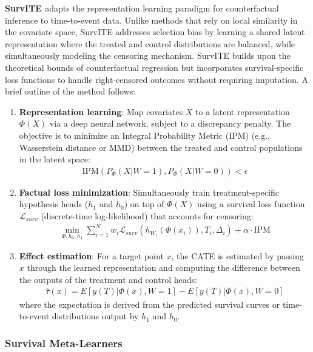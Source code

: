 \textbf{SurvITE \citep{curth2021survite}} adapts the representation learning paradigm for counterfactual inference to time-to-event data. Unlike methods that rely on local similarity in the covariate space, SurvITE addresses selection bias by learning a shared latent representation where the treated and control distributions are balanced, while simultaneously modeling the censoring mechanism.
SurvITE builds upon the theoretical bounds of counterfactual regression but incorporates survival-specific loss functions to handle right-censored outcomes without requiring imputation.
A brief outline of the method follows:
\begin{enumerate}
    \item \textbf{Representation learning}: Map covariates $X$ to a latent representation $\Phi(X)$ via a deep neural network, subject to a discrepancy penalty.
The objective is to minimize an Integral Probability Metric (IPM) (e.g., Wasserstein distance or MMD) between the treated and control populations in the latent space:
        \begin{align*}
            \text{IPM}(P_{\Phi}(X|W=1), P_{\Phi}(X|W=0)) < \epsilon
        \end{align*}
    \item \textbf{Factual loss minimization}: Simultaneously train treatment-specific hypothesis heads ($h_1$ and $h_0$) on top of $\Phi(X)$ using a survival loss function $\mathcal{L}_{surv}$ (discrete-time log-likelihood) that accounts for censoring:
        \begin{align*}
            \min_{\Phi, h_0, h_1} \sum_{i=1}^N w_i \mathcal{L}_{surv}(h_{W_i}(\Phi(x_i)), T_i, \Delta_i) + \alpha \cdot \text{IPM}
        \end{align*}
    \item \textbf{Effect estimation}: For a target point $x$, the CATE is estimated by passing $x$ through the learned representation and computing the difference between the outputs of the treatment and control heads:
        \begin{align*}
             \hat{\tau}(x) = E[y(T)|\Phi(x), W=1] - E[y(T)|\Phi(x), W=0]
        \end{align*}
        where the expectation is derived from the predicted survival curves or time-to-event distributions output by $h_1$ and $h_0$.
\end{enumerate}


\subsubsection{Survival Meta-Learners}

